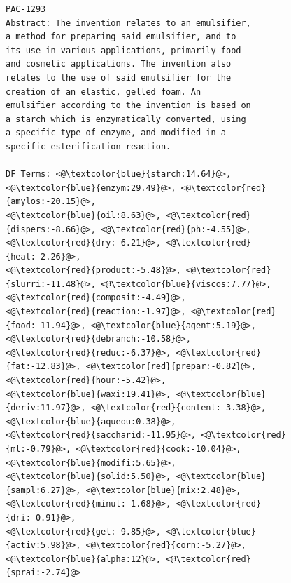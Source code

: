 \begin{figure}[t!]
\begin{framed}
\vspace*{-2ex}
  \centering
 \begin{lstlisting}[basicstyle=\scriptsize\ttfamily , linewidth=\columnwidth,breaklines=true] 
PAC-1293
Abstract: The invention relates to an emulsifier, 
a method for preparing said emulsifier, and to 
its use in various applications, primarily food 
and cosmetic applications. The invention also 
relates to the use of said emulsifier for the 
creation of an elastic, gelled foam. An 
emulsifier according to the invention is based on 
a starch which is enzymatically converted, using 
a specific type of enzyme, and modified in a 
specific esterification reaction.

DF Terms: <@\textcolor{blue}{starch:14.64}@>, <@\textcolor{blue}{enzym:29.49}@>, <@\textcolor{red}{amylos:-20.15}@>, 
<@\textcolor{blue}{oil:8.63}@>, <@\textcolor{red}{dispers:-8.66}@>, <@\textcolor{red}{ph:-4.55}@>, <@\textcolor{red}{dry:-6.21}@>, <@\textcolor{red}{heat:-2.26}@>, 
<@\textcolor{red}{product:-5.48}@>, <@\textcolor{red}{slurri:-11.48}@>, <@\textcolor{blue}{viscos:7.77}@>, <@\textcolor{red}{composit:-4.49}@>, 
<@\textcolor{red}{reaction:-1.97}@>, <@\textcolor{red}{food:-11.94}@>, <@\textcolor{blue}{agent:5.19}@>, <@\textcolor{red}{debranch:-10.58}@>, 
<@\textcolor{red}{reduc:-6.37}@>, <@\textcolor{red}{fat:-12.83}@>, <@\textcolor{red}{prepar:-0.82}@>, <@\textcolor{red}{hour:-5.42}@>, 
<@\textcolor{blue}{waxi:19.41}@>, <@\textcolor{blue}{deriv:11.97}@>, <@\textcolor{red}{content:-3.38}@>, <@\textcolor{blue}{aqueou:0.38}@>, 
<@\textcolor{red}{saccharid:-11.95}@>, <@\textcolor{red}{ml:-0.79}@>, <@\textcolor{red}{cook:-10.04}@>, <@\textcolor{blue}{modifi:5.65}@>, 
<@\textcolor{blue}{solid:5.50}@>, <@\textcolor{blue}{sampl:6.27}@>, <@\textcolor{blue}{mix:2.48}@>, <@\textcolor{red}{minut:-1.68}@>, <@\textcolor{red}{dri:-0.91}@>, 
<@\textcolor{red}{gel:-9.85}@>, <@\textcolor{blue}{activ:5.98}@>, <@\textcolor{red}{corn:-5.27}@>, <@\textcolor{blue}{alpha:12}@>, <@\textcolor{red}{sprai:-2.74}@> 


\end{lstlisting}
\end{framed}
\end{figure}
